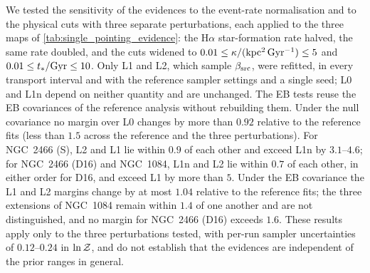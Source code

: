 We tested the sensitivity of the evidences to the event-rate normalisation and to the physical cuts with three separate perturbations, each applied to the three maps of \autoref{tab:single_pointing_evidence}: the H$\alpha$ star-formation rate halved, the same rate doubled, and the cuts widened to $0.01\leq\kappa/({\rm kpc^2\,Gyr^{-1}})\leq5$ and $0.01\leq t_\ast/{\rm Gyr}\leq10$. Only L1 and L2, which sample $\beta_{\rm src}$, were refitted, in every transport interval and with the reference sampler settings and a single seed; L0 and L1n depend on neither quantity and are unchanged. The EB tests reuse the EB covariances of the reference analysis without rebuilding them. Under the null covariance no margin over L0 changes by more than $0.92$ relative to the reference fits (less than $1.5$ across the reference and the three perturbations). For NGC~2466 (S), L2 and L1 lie within $0.9$ of each other and exceed L1n by $3.1$--$4.6$; for NGC~2466 (D16) and NGC~1084, L1n and L2 lie within $0.7$ of each other, in either order for D16, and exceed L1 by more than $5$. Under the EB covariance the L1 and L2 margins change by at most $1.04$ relative to the reference fits; the three extensions of NGC~1084 remain within $1.4$ of one another and are not distinguished, and no margin for NGC~2466 (D16) exceeds $1.6$. These results apply only to the three perturbations tested, with per-run sampler uncertainties of $0.12$--$0.24$ in $\ln{\cal Z}$, and do not establish that the evidences are independent of the prior ranges in general.
